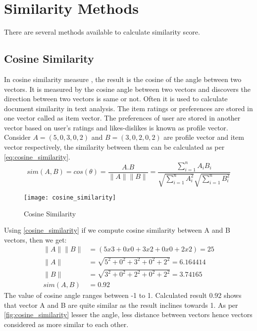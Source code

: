 
\section{Similarity Methods}
\label{similarity_methods}
There are several methods available to calculate similarity score.
\\

\subsection{Cosine Similarity}
\label{cosine_similarity}
In cosine similarity measure \cite{19}, the result is the cosine of the angle between two vectors. It is measured by the cosine angle between two vectors and discovers the direction between two vectors is same or not. Often it is used to calculate document similarity in text analysis. The item ratings or preferences are stored in one vector called as item vector. The preferences of user are stored in another vector based on user's ratings and likes-dislikes is known as profile vector. Consider $A = (5,0,3,0,2)$ and $B = (3,0,2,0,2)$ are profile vector and item vector respectively, the similarity between them can be calculated as per \autoref{eq:cosine_similarity}.
\\

\begin{equation}
sim(A,B) = cos(\theta) = \frac {A.B}{\parallel A \parallel \parallel B \parallel} = \frac{\sum_{i=1}^{n} {A_{i} B_{i}}}{\sqrt{\sum_{i=1}^{n} {A_{i}^2}} \sqrt{\sum_{i=1}^{n} {B_{i}^2}}}
\label{eq:cosine_similarity}
\end{equation}

\begin{figure}[H]
	\centering
	\texttt{[image: cosine\_similarity]}
	\caption{Cosine Similarity}
	\label{fig:cosine_similarity}
\end{figure}

\noindent
Using \autoref{cosine_similarity} if we compute cosine similarity between A and B vectors, then we get:
\begin{align*}
\parallel A \parallel \parallel B \parallel &=(5 x 3 + 0 x 0 + 3 x 2 + 0 x 0 + 2 x 2  ) = 25 \\
\parallel A \parallel  &= \sqrt{5^2 + 0^2 + 3^2 + 0^2 + 2^2}  = 6.164414 \\	     
\parallel B \parallel  &= \sqrt{3^2 + 0^2 + 2^2 + 0^2 + 2^2}  = 3.74165\\	     
sim(A,B)  &=  0.92 
\end{align*}
\noindent The value of cosine angle ranges between -1 to 1. Calculated result 0.92 shows that vector A and B are quite similar as the result inclines towards 1. As per \autoref{fig:cosine_similarity} lesser the angle, less distance between vectors hence vectors considered as more similar to each other.
\\
